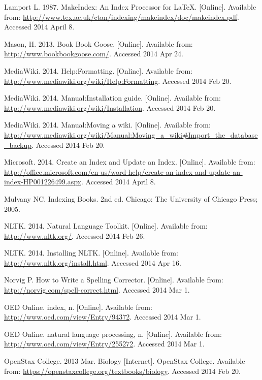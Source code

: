 \begin{thebibliography}{99}
Lamport L. 1987. MakeIndex: An Index Processor for \LaTeX. [Online]. Available from: \url{http://www.tex.ac.uk/ctan/indexing/makeindex/doc/makeindex.pdf}. Accessed 2014 April 8.

Mason, H. 2013. Book Book Goose. [Online]. Available from: \url{http://www.bookbookgoose.com/}. Accessed 2014 Apr 24.

MediaWiki. 2014. Help:Formatting. [Online]. Available from: \url{http://www.mediawiki.org/wiki/Help:Formatting}. Accessed 2014 Feb 20.

MediaWiki. 2014. Manual:Installation guide. [Online]. Available from: \url{http://www.mediawiki.org/wiki/Installation}. Accessed 2014 Feb 20.

MediaWiki. 2014. Manual:Moving a wiki. [Online]. Available from: \url{http://www.mediawiki.org/wiki/Manual:Moving_a_wiki#Import_the_database_backup}. Accessed 2014 Feb 20.

Microsoft. 2014. Create an Index and Update an Index. [Online]. Available from: \url{http://office.microsoft.com/en-us/word-help/create-an-index-and-update-an-index-HP001226499.aspx}. Accessed 2014 April 8.

Mulvany NC. Indexing Books. 2nd ed. Chicago: The University of Chicago Press; 2005.

NLTK. 2014. Natural Language Toolkit. [Online]. Available from: \url{http://www.nltk.org/}. Accessed 2014 Feb 26.

NLTK. 2014. Installing NLTK. [Online]. Available from: \url{http://www.nltk.org/install.html}. Accessed 2014 Apr 16.

Norvig P. How to Write a Spelling Corrector. [Online]. Available from: \url{http://norvig.com/spell-correct.html}. Accessed 2014 Mar 1.

OED Online. index, n. [Online]. Available from: \url{http://www.oed.com/view/Entry/94372}. Accessed 2014 Mar 1.

OED Online. natural language processing, n. [Online]. Available from: \url{http://www.oed.com/view/Entry/255272}. Accessed 2014 Mar 1.

OpenStax College. 2013 Mar. Biology [Internet]. OpenStax College. Available from: \url{https://openstaxcollege.org/textbooks/biology}. Accessed 2014 Feb 20.


\end{thebibliography}
